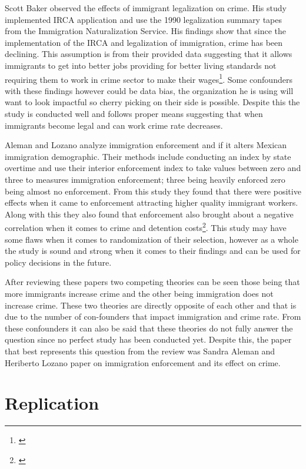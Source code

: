 \documentclass[12pt,letterpaper]{article}
\begin{document}
    \indent Scott Baker observed the effects of immigrant legalization on crime. His study implemented IRCA application and use the 1990 legalization summary tapes from the Immigration Naturalization Service. His findings show that since the implementation of the IRCA and legalization of immigration, crime has been declining. This assumption is from their provided data suggesting that it allows immigrants to get into better jobs providing for better living standards not requiring them to work in crime sector to make their wages\footnote{\citep{B_Scott}}. Some confounders with these findings however could be data bias, the organization he is using will want to look impactful so cherry picking on their side is possible. Despite this the study is conducted well and follows proper means suggesting that when immigrants become legal and can work crime rate decreases.
    
    \indent Aleman and Lozano analyze immigration enforcement and if it alters Mexican immigration demographic. Their methods include conducting an index by state overtime and use their interior enforcement index to take values between zero and three to measures immigration enforcement; three being heavily enforced zero being almost no enforcement. From this study they found that there were positive effects when it came to enforcement attracting higher quality immigrant workers. Along with this they also found that enforcement also brought about a negative correlation when it comes to crime and detention costs\footnote{\citep{O_G}}. This study may have some flaws when it comes to randomization of their selection, however as a whole the study is sound and strong when it comes to their findings and can be used for policy decisions in the future.
    
    \indent After reviewing these papers two competing theories can be seen those being that more immigrants increase  crime and the other being immigration does not increase crime. These two theories are directly opposite of each other and that is due to the number of con-founders that impact immigration and crime rate. From these confounders it can also be said that these theories do not fully answer the question since no perfect study has been conducted yet. Despite this, the paper that best represents this question from the review was Sandra Aleman and Heriberto Lozano paper on immigration enforcement and its effect on crime. 

\section{Replication}
   
\end{document}
